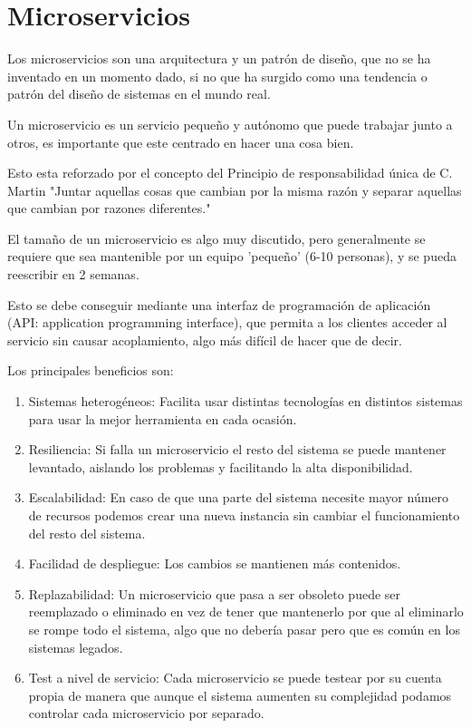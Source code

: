 \section{Microservicios}

Los microservicios son una arquitectura y un patrón de diseño, que no se ha inventado en un momento dado, si no que ha surgido como una tendencia o patrón del diseño de sistemas en el mundo real. 

Un microservicio es un servicio pequeño y autónomo que puede trabajar junto a otros, es importante que este centrado en hacer una cosa bien.

Esto esta reforzado por el concepto del Principio de responsabilidad única de C. Martin\cite{martin03} "Juntar aquellas cosas que cambian por la misma razón y separar aquellas que cambian por razones diferentes."

El tamaño de un microservicio es algo muy discutido, pero generalmente se requiere que sea mantenible por un equipo 'pequeño' (6-10 personas), y se pueda reescribir en 2 semanas.

Esto se debe conseguir mediante una interfaz de programación de aplicación (API: application programming interface), que permita a los clientes acceder al servicio sin causar acoplamiento, algo más difícil de hacer que de decir.

Los principales beneficios son:
\begin{enumerate}
\item Sistemas heterogéneos: Facilita usar distintas tecnologías en distintos sistemas para usar la mejor herramienta en cada ocasión.
\item Resiliencia: Si falla un microservicio el resto del sistema se puede mantener levantado, aislando los problemas y facilitando la alta disponibilidad.
\item Escalabilidad: En caso de que una parte del sistema necesite mayor número de recursos podemos crear una nueva instancia sin cambiar el funcionamiento del resto del sistema.
\item Facilidad de despliegue: Los cambios se mantienen más contenidos.
\item Replazabilidad: Un microservicio que pasa a ser obsoleto puede ser reemplazado o eliminado en vez de tener que mantenerlo por que al eliminarlo se rompe todo el sistema, algo que no debería pasar pero que es común en los sistemas legados.
\item Test a nivel de servicio: Cada microservicio se puede testear por su cuenta propia de manera que aunque el sistema aumenten su complejidad podamos controlar cada microservicio por separado.
\end{enumerate}

